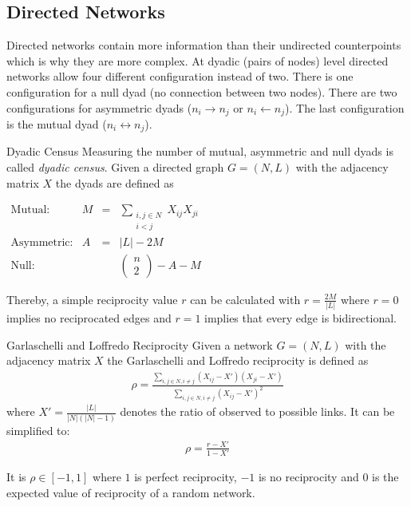 \documentclass[english]{panikzettel}
\begin{document}
\subsection{Directed Networks}
Directed networks contain more information than their undirected counterpoints which is why they are more complex.
At dyadic (pairs of nodes) level directed networks allow four different configuration instead of two.
There is one configuration for a null dyad (no connection between two nodes).
There are two configurations for asymmetric dyads ($ n_i \rightarrow n_j $ or $ n_i \leftarrow n_j $).
The last configuration is the mutual dyad ($ n_i \leftrightarrow n_j $).

\begin{defi}{Dyadic Census}
Measuring the number of mutual, asymmetric and null dyads is called \textit{dyadic census}.
Given a directed graph $ G = (N,L) $ with the adjacency matrix $ X $ the dyads are defined as

$ \begin{array}{lrcl}
\text{Mutual:} & M & = & \sum\limits_{\substack{i,j \in N\\ i < j}} X_{ij} X_{ji} \\
\text{Asymmetric:} & A & = & |L| - 2 M \\
\text{Null:} &&& \left(\begin{array}{c}
n \\ 2
\end{array}\right) - A - M
\end{array} $
\end{defi}

Thereby, a simple reciprocity value $ r $ can be calculated with $ r = \frac{2M}{|L|} $ where $ r = 0 $ implies no reciprocated edges and $ r = 1 $ implies that every edge is bidirectional.

\begin{defi}{Garlaschelli and Loffredo Reciprocity}
Given a network $ G = (N,L) $ with the adjacency matrix $ X $ the Garlaschelli and Loffredo reciprocity is defined as
\begin{align*}
	\rho = \frac{\sum\limits_{i,j \in N, i \neq j} (X_{ij} - X') (X_{ji} - X')}{\sum\limits_{i,j \in N, i \neq j} (X_{ij} - X')^2}
\end{align*}
where $ X' = \frac{|L|}{|N| (|N| - 1)} $ denotes the ratio of observed to possible links.
It can be simplified to:
\begin{align*}
	\rho = \frac{r - X'}{1 - X'}
\end{align*}

It is $ \rho \in [-1,1] $ where $ 1 $ is perfect reciprocity, $ -1 $ is no reciprocity and $ 0 $ is the expected value of reciprocity of a random network.
\end{defi}
\end{document}

